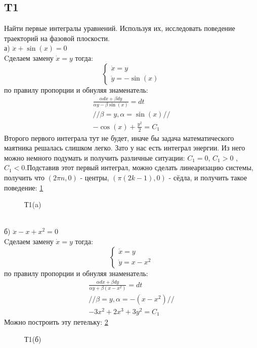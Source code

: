 \documentclass{article}
\begin{document}
\subsection{T1} 
Найти первые интегралы уравнений. Используя их, исследовать поведение траекторий на фазовой плоскости.\\
а) $\ddot x + \sin{(x)}=0$\\
Cделаем замену $\dot x = y$ тогда:
\begin{equation*}
    \begin{cases}
        \dot x=y\\
        \dot y = -\sin{(x)}
    \end{cases}
\end{equation*}
по правилу пропорции и обнуляя знаменатель:
\begin{gather*}
    \frac{\alpha dx + \beta dy}{\alpha y - \beta \sin{(x)}}=dt \\
     //\beta=y,\alpha=\sin{(x)}//\\ 
     -\cos{(x)}+\frac{y^2}{2}=C_1
\end{gather*}
Второго первого интеграла тут не будет, иначе бы задача математического маятника решалась слишком легко. Зато у нас есть интеграл энергии. Из него можно немного подумать и получить различные ситуации: $C_1=0$, $C_1>0$ , $C_1<0$.Подставив этот первый интеграл, можно сделать линеаризацию системы, получить что $(2\pi n,0)$ - центры, $(\pi (2k-1),0)$ - сёдла, и получить такое поведение: \ref{fig:Т1a}
\begin{figure}[h!]
\caption{Т1(a)}
\label{fig:Т1a}
\end{figure} \\
б) $\ddot x-x+x^2=0$ \\
Cделаем замену $\dot x = y$ тогда:
\begin{equation*}
    \begin{cases}
        \dot x=y\\
        \dot y = x-x^2
    \end{cases}
\end{equation*}
по правилу пропорции и обнуляя знаменатель:
\begin{gather*}
    \frac{\alpha dx + \beta dy}{\alpha y + \beta (x-x^2)}=dt \\
     //\beta=y,\alpha=-(x-x^2)//  \\ 
     -3x^2+2x^3+3y^2=C_1
\end{gather*}
Можно построить эту петельку: \ref{fig:Т1b}
\begin{figure}[h!]
\caption{Т1(б)}
\label{fig:Т1b}
\end{figure} \\
\end{document}
